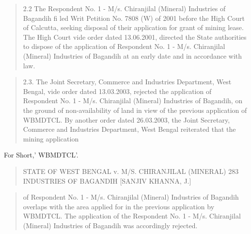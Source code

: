 \documentclass[12pt,a4paper]{article}
\newenvironment{judgequote}
  {\begin{quote}\small}
  {\end{quote}}
\begin{document}
\begin{judgequote}
2.2 The Respondent No. 1 - M/s. Chiranjilal (Mineral) Industries of
Bagandih fi led Writ Petition No. 7808 (W) of 2001 before the High Court
of Calcutta, seeking disposal of their application for grant of mining lease.
The High Court vide order dated 13.06.2001, directed the State authorities to
dispose of the application of Respondent No. 1 - M/s. Chiranjilal (Mineral)
Industries of Bagandih at an early date and in accordance with law.
\end{judgequote}

\begin{judgequote}
2.3. The Joint Secretary, Commerce and Industries Department, West
Bengal, vide order dated 13.03.2003, rejected the application of Respondent
No. 1 - M/s. Chiranjilal (Mineral) Industries of Bagandih, on the ground of
non-availability of land in view of the previous application of WBMDTCL.
By another order dated 26.03.2003, the Joint Secretary, Commerce and
Industries Department, West Bengal reiterated that the mining application
\end{judgequote}

 For Short,' WBMDTCL'.




\begin{judgequote}
STATE OF WEST BENGAL v. M/S. CHIRANJILAL (MINERAL) 283
INDUSTRIES OF BAGANDIH [SANJIV KHANNA, J.]
\end{judgequote}

\begin{judgequote}
of Respondent No. 1 - M/s. Chiranjilal (Mineral) Industries of Bagandih
overlaps with the area applied for in the previous application by WBMDTCL.
The application of the Respondent No. 1 - M/s. Chiranjilal (Mineral)
Industries of Bagandih was accordingly rejected.
\end{judgequote}
\end{document}
